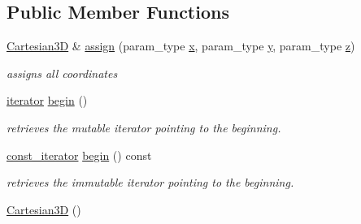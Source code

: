 \subsection*{Public Member Functions}
\begin{DoxyCompactItemize}
\item 
\hypertarget{classhryky_1_1geometry_1_1coord_1_1_cartesian3_d_a85d62db370cf7ed1d94fc24bc1353d6b}{\hyperlink{classhryky_1_1geometry_1_1coord_1_1_cartesian3_d}{Cartesian3\-D} \& \hyperlink{classhryky_1_1geometry_1_1coord_1_1_cartesian3_d_a85d62db370cf7ed1d94fc24bc1353d6b}{assign} (param\-\_\-type \hyperlink{classhryky_1_1geometry_1_1coord_1_1_cartesian3_d_a4dcd5b0cc85e0e3d4827bf552445c6c7}{x}, param\-\_\-type \hyperlink{classhryky_1_1geometry_1_1coord_1_1_cartesian3_d_ae56136dedbe50c752ca22a9fcd674ce3}{y}, param\-\_\-type \hyperlink{classhryky_1_1geometry_1_1coord_1_1_cartesian3_d_ae650aeb76f156baba297d8649dc3ff49}{z})}\label{classhryky_1_1geometry_1_1coord_1_1_cartesian3_d_a85d62db370cf7ed1d94fc24bc1353d6b}

\begin{DoxyCompactList}\small\item\em assigns all coordinates \end{DoxyCompactList}\item 
\hypertarget{classhryky_1_1_array_a12db8f567aa91dbbae25dca68db6e4d3}{\hyperlink{classhryky_1_1iterator_1_1random_1_1_mutable}{iterator} \hyperlink{classhryky_1_1_array_a12db8f567aa91dbbae25dca68db6e4d3}{begin} ()}\label{classhryky_1_1_array_a12db8f567aa91dbbae25dca68db6e4d3}

\begin{DoxyCompactList}\small\item\em retrieves the mutable iterator pointing to the beginning. \end{DoxyCompactList}\item 
\hypertarget{classhryky_1_1_array_a2e6fb08c9e286b0f33e17b98182a4cc7}{\hyperlink{classhryky_1_1iterator_1_1random_1_1_immutable}{const\-\_\-iterator} \hyperlink{classhryky_1_1_array_a2e6fb08c9e286b0f33e17b98182a4cc7}{begin} () const}\label{classhryky_1_1_array_a2e6fb08c9e286b0f33e17b98182a4cc7}

\begin{DoxyCompactList}\small\item\em retrieves the immutable iterator pointing to the beginning. \end{DoxyCompactList}\item 
\hypertarget{classhryky_1_1geometry_1_1coord_1_1_cartesian3_d_a3a2f42dba5fb61fe7c91a94ebd85091e}{\hyperlink{classhryky_1_1geometry_1_1coord_1_1_cartesian3_d_a3a2f42dba5fb61fe7c91a94ebd85091e}{Cartesian3\-D} ()}\label{classhryky_1_1geometry_1_1coord_1_1_cartesian3_d_a3a2f42dba5fb61fe7c91a94ebd85091e}


\end{DoxyCompactItemize}
